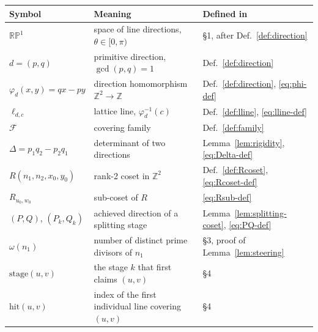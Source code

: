 \documentclass[a4paper,11pt,oneside,reqno]{amsart}
\theoremstyle{definition}
\theoremstyle{remark}
\theoremstyle{plain}
\newcommand{\Z}{\mathbb{Z}}
\newcommand{\RP}{\mathbb{RP}^1}
\begin{document}
\begin{center}
\begin{tabular}{@{}p{}p{}p{}@{}}
\hline
\textbf{Symbol} & \textbf{Meaning} & \textbf{Defined in} \\
\hline
\(\RP\) & space of line directions, \(\theta\in[0,\pi)\) & \S1, after Def.~\ref{def:direction} \\
\(d=(p,q)\) & primitive direction, \(\gcd(p,q)=1\) & Def.~\ref{def:direction} \\
\(\varphi_d(x,y)=qx-py\) & direction homomorphism \(\Z^2\to\Z\) & Def.~\ref{def:direction},
  \eqref{eq:phi-def} \\
\(\ell_{d,c}\) & lattice line, \(\varphi_d^{-1}(c)\) & Def.~\ref{def:lline}, \eqref{eq:lline-def} \\
\(\mathcal F\) & covering family & Def.~\ref{def:family} \\
\(\Delta=p_1q_2-p_2q_1\) & determinant of two directions & Lemma~\ref{lem:rigidity},
  \eqref{eq:Delta-def} \\
\(R(n_1,n_2,x_0,y_0)\) & rank-2 coset in \(\Z^2\) & Def.~\ref{def:Rcoset}, \eqref{eq:Rcoset-def} \\
\(R_{u_0,w_0}\) & sub-coset of \(R\) & \eqref{eq:Rsub-def} \\
\((P,Q)\), \((P_k,Q_k)\) & achieved direction of a splitting stage & Lemma~\ref{lem:splitting-coset},
  \eqref{eq:PQ-def} \\
\(\omega(n_1)\) & number of distinct prime divisors of \(n_1\) & \S3, proof of
  Lemma~\ref{lem:steering} \\
\(\mathrm{stage}(u,v)\) & the stage \(k\) that first claims \((u,v)\) & \S4 \\
\(\mathrm{hit}(u,v)\) & index of the first individual line covering \((u,v)\) & \S4 \\
\hline
\end{tabular}
\end{center}
\end{document}
